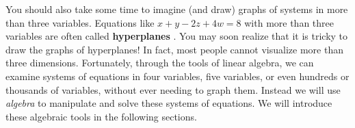 You should also take some time to imagine (and draw) graphs of systems
in more than three variables.  Equations like $x+y-2z+4w=8$ with more
than three variables are often called \textbf{hyperplanes}%
%
.  You may soon realize that it is tricky to
draw the graphs of hyperplanes! In fact, most people cannot visualize
more than three dimensions. Fortunately, through the tools of linear
algebra, we can examine systems of equations in four variables, five
variables, or even hundreds or thousands of variables, without ever
needing to graph them. Instead we will use {\em algebra} to manipulate
and solve these systems of equations. We will introduce these
algebraic tools in the following sections.
